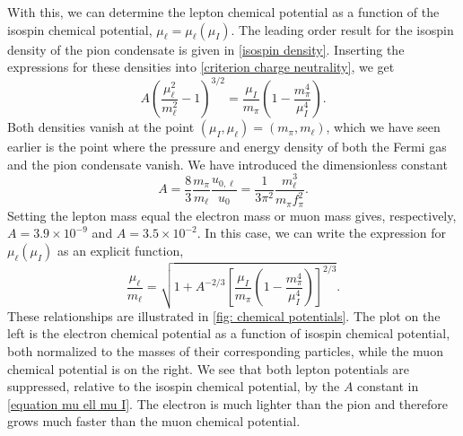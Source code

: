 %
With this, we can determine the lepton chemical potential as a function of the isospin chemical potential, $\mu_\ell = \mu_\ell(\mu_I)$.
The leading order result for the isospin density of the pion condensate is given in \autoref{isospin density}.
Inserting the expressions for these densities into \autoref{criterion charge neutrality}, we get
%
\begin{equation}
    \label{equation mu ell mu I}
    A \left(\frac{\mu_\ell^2 }{m_\ell^2} - 1 \right)^{3/2}
    = \frac{\mu_I}{m_\pi}\left( 1 - \frac{m_\pi^4}{\mu_I^4}  \right).
\end{equation}
%
Both densities vanish at the point $(\mu_I, \mu_\ell) = (m_\pi, m_\ell)$, which we have seen earlier is the point where the pressure and energy density of both the Fermi gas and the pion condensate vanish.
We have introduced the dimensionless constant
%
\begin{equation}
    A = \frac{8}{3} \frac{m_\pi} {m_\ell} \frac{u_{0, \ell}}{u_0}
    = \frac{1}{3 \pi^2} \frac{m_\ell^3}{m_\pi f_\pi^2}.
\end{equation}
%
Setting the lepton mass equal the electron mass or muon mass gives, respectively, $A = 3.9 \times10^{- 9}$ and $A = 3.5 \times 10^{-2}$.
In this case, we can write the expression for $\mu_\ell(\mu_I)$ as an explicit function,
%
\begin{equation}
    \label{mu ell from mu I}
    \frac{\mu_\ell}{m_\ell}
    =
    \sqrt{
        1 + A^{-2/3}
        \left[
            \frac{\mu_I}{m_\pi}\left( 1 - \frac{m_\pi^4}{\mu_I^4}  \right)
        \right]^{2/3}
    }.
\end{equation}
%
These relationships are illustrated in \autoref{fig: chemical potentials}.
The plot on the left is the electron chemical potential as a function of isospin chemical potential, both normalized to the masses of their corresponding particles, while the muon chemical potential is on the right.
We see that both lepton potentials are suppressed, relative to the isospin chemical potential, by the $A$ constant in \autoref{equation mu ell mu I}.
The electron is much lighter than the pion and therefore grows much faster than the muon chemical potential.

